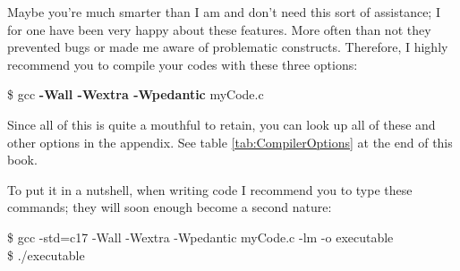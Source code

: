 Maybe you're much smarter than I am and don't need this sort of assistance; I for one have been very happy about these features. More often than not they prevented bugs or made me aware of problematic constructs. Therefore, I highly recommend you to compile your codes with these three options:
\begin{cmdbox}
\$ gcc \textbf{-Wall -Wextra -Wpedantic} myCode.c
\end{cmdbox}

Since all of this is quite a mouthful to retain, you can look up all of these and other options in the appendix. See table \ref{tab:CompilerOptions} at the end of this book.

To put it in a nutshell, when writing code I recommend you to type these commands; they will soon enough become a second nature:
\begin{cmdbox}
\$ gcc -std=c17 -Wall -Wextra -Wpedantic myCode.c -lm -o executable \\
\$ ./executable
\end{cmdbox}


